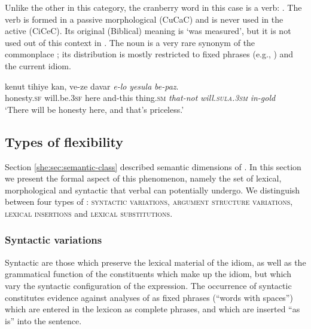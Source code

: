 \documentclass[output=paper]{langsci/langscibook}
\begin{document}
\noindent{} Unlike the other  in this category, the cranberry word in this case is a verb: . The verb is formed in a passive morphological  (CuCaC) and is never used in the active  (CiCeC). Its original (Biblical) meaning is `was measured', but it is not used out of this context in . The noun  is a very rare synonym of the commonplace ; its distribution is mostly restricted to fixed phrases (e.g., ) and the current idiom.

	\ea\label{she:yesula-canon}
    	\gll kenut tihiye kan, ve-ze davar \textit{{\shin}e-lo} \textit{yesula} \textit{be-paz}.\\
    	   honesty.\textsc{sf} will.be.\textsc{3sf} here and-this thing.\textsc{sm} \textit{that-not} \textit{will.\textsc{sula}.\textsc{3sm}} \textit{in-gold}\\
    	\glt `There will be honesty here, and that's priceless.'
	\z


\subsection{Types of flexibility}

Section \ref{she:sec:semantic-class} described semantic dimensions of . In this section we present the formal aspect of this phenomenon, namely the set of lexical, morphological and syntactic  that verbal  can potentially undergo. We distinguish between four types of : {\scshape syntactic variations}, {\scshape argument structure variations}, {\scshape lexical insertions} and {\scshape lexical substitutions}.

\subsubsection{Syntactic variations}
\label{she:sec:syn-var}
Syntactic  are those which preserve the lexical material of the idiom, as well as the grammatical function of the constituents which make up the idiom, but which vary the syntactic configuration of the expression. The occurrence of syntactic  constitutes evidence against analyses of  as fixed phrases (``words with spaces'') which are entered in the lexicon as complete phrases, and which are inserted ``as is'' into the sentence.
\end{document}
